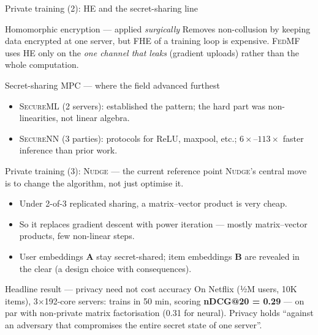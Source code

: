\documentclass[10pt,aspectratio=169]{beamer}
\newcommand{\sys}[1]{\textsc{#1}\xspace}
\begin{document}
\begin{frame}{Private training (2): HE and the secret-sharing line}
  \begin{block}{Homomorphic encryption --- applied \emph{surgically}}
    \footnotesize
    Removes non-collusion by keeping data encrypted at one server, but FHE of a
    training loop is expensive. \sys{FedMF} uses HE only on the \emph{one channel that
    leaks} (gradient uploads) rather than the whole computation.
  \end{block}
 
  \begin{block}{Secret-sharing MPC --- where the field advanced furthest}
    \footnotesize
    \begin{itemize}
      \item \sys{SecureML} (2 servers): established the pattern; the hard part was
            non-linearities, not linear algebra.
      \item \sys{SecureNN} (3 parties): protocols for ReLU, maxpool, etc.; $6\times$--$113\times$
            faster inference than prior work.
    \end{itemize}
  \end{block}
\end{frame}
 
\begin{frame}{Private training (3): \sys{Nudge} --- the current reference point}
  \sys{Nudge}'s central move is to \alert{change the algorithm}, not just optimise it.
 
  \begin{itemize}
    \item Under 2-of-3 replicated sharing, a matrix--vector product is very cheap.
    \item So it replaces gradient descent with \alert{power iteration} --- mostly
          matrix--vector products, few non-linear steps.
    \item User embeddings $\mathbf{A}$ stay secret-shared; item embeddings $\mathbf{B}$
          are revealed in the clear (a design choice with consequences).
  \end{itemize}
 
  \begin{alertblock}{Headline result --- privacy need not cost accuracy}
    On Netflix (½M users, 10K items), 3$\times$192-core servers:
    trains in 50 min, scoring \textbf{nDCG@20 = 0.29} --- on par with non-private
    matrix factorisation (0.31 for neural). Privacy holds ``against an adversary
    that compromises the entire secret state of one server''.
  \end{alertblock}
\end{frame}
 
\end{document}
